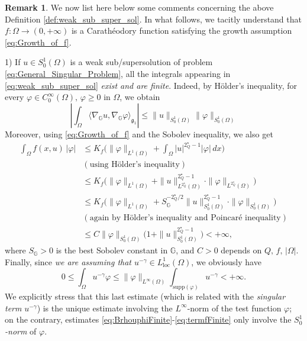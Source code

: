 \documentclass[11pt]{amsart}
\numberwithin{equation}{section} %
\theoremstyle{definition}
\newtheorem{rmk}[teo]{Remark}
\begin{document}
 \begin{rmk} \label{rem:defweaksolPb}
	We now list here below some comments concerning the above Definition \ref{def:weak_sub_super_sol}. In what follows,
	we tacitly understand that $f:\Omega\to(0,+\infty)$ is a Carath\'eodory function satisfying
	the growth
	assumption \eqref{eq:Growth_of_f}.
	\medskip
	
	1)\,\,If $u\in S^{1}_{0}(\Omega)$ is a weak sub/supersolution of problem
	\eqref{eq:General_Singular_Problem}, all the integrals appearing in \eqref{eq:weak_sub_super_sol} 
	\emph{exist and are finite}.
	Indeed, by H\"older's inequality, for every 
	$\varphi\in C_0^\infty(\Omega),\,\text{$\varphi\geq 0$ in $\Omega$}$, 
	we obtain 
	\begin{equation} \label{eq:BrhouphiFinite}
				\left|\int_{\Omega}\langle \nabla_{\mathbb{G}}u, \nabla_{\mathbb{G}}\varphi \rangle_{\mathfrak{g}_{1}}\right|  \leq 
			\| u\|_{S_0^1(\Omega)}\|\varphi\|_{S_0^1(\Omega)}
	\end{equation}
	Moreover, using \eqref{eq:Growth_of_f} and the Sobolev inequality, we also get
	\begin{equation} \label{eq:termfFinite}
		\begin{split}
			\int_\Omega f(x,u)\,|\varphi|& \leq K_f\Big(\|\varphi\|_{L^1(\Omega)}
			+ \int_{\Omega}|u|^{2^{\star}_{Q}-1}|\varphi|\,dx\Big) \\
			& (\text{using H\"older's inequality}) \\
			& \leq  K_f\big(\|\varphi\|_{L^1(\Omega)}
			+\|u\|_{L^{2^{\star}_{Q}}(\Omega)}^{2^{\star}_{Q}-1}\cdot\|\varphi\|_{L^{2^{\star}_{Q}}(\Omega)}\big) \\
			& \leq K_f\big(\|\varphi\|_{L^1(\Omega)}
			+S_{\mathbb{G}}^{-2^{\star}_{Q}/2}\| u\|_{S_0^1(\Omega)}^{2^{\star}_{Q}-1}\cdot\| \varphi\|_{S_0^1(\Omega)}\big) \\
			& (\text{again by H\"older's inequality and Poincaré inequality}) \\
			& \leq C\| \varphi\|_{S_0^1(\Omega)}\big(1+\| u\|_{S_0^1(\Omega)}^{2^{\star}_{Q}-1}\big)<+\infty,
		\end{split}
	\end{equation}
	where $S_{\mathbb{G}} > 0$ is the best Sobolev constant in $\mathbb{G}$, and $C > 0$ depends on $Q,\,f,\,|\Omega|$.
	Fi\-nally, since \emph{we are assuming that $u^{-\gamma}\in L^1_{\mathrm{loc}}(\Omega)$}, we obviously
	have
	$$0\leq \int_\Omega u^{-\gamma}\varphi  \leq 
	\|\varphi\|_{L^\infty(\Omega)}\int_{\mathrm{supp}(\varphi)}u^{-\gamma}< +\infty. 
	$$
	We explicitly stress that this last estimate 
	(which is related with the \emph{singular term} $u^{-\gamma}$) is the unique estimate involving
	the $L^\infty$-norm of the test function $\varphi$; on the contrary, 
	estimates \eqref{eq:BrhouphiFinite}-\eqref{eq:termfFinite} only involve
	the \emph{$S_0^1$-norm} of $\varphi$.
	\vspace*{0.1cm}
	

\end{rmk}
\end{document}

